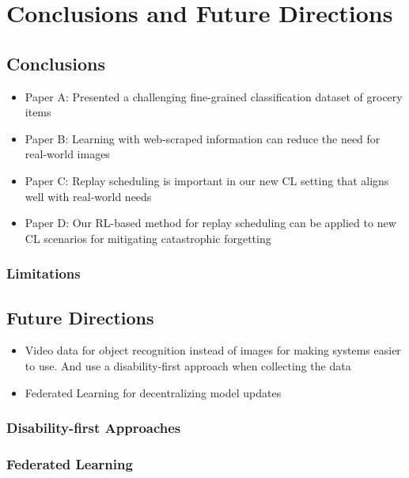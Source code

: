 
\chapter{Conclusions and Future Directions}\label{chap:conclusions}

\section{Conclusions}\label{sec:conclusions}

\begin{itemize}
	\item Paper A: Presented a challenging fine-grained classification dataset of grocery items
	\item Paper B: Learning with web-scraped information can reduce the need for real-world images
	\item Paper C: Replay scheduling is important in our new CL setting that aligns well with real-world needs
	\item Paper D: Our RL-based method for replay scheduling can be applied to new CL scenarios for mitigating catastrophic forgetting
\end{itemize}



\subsection{Limitations}


\section{Future Directions}\label{sec:future_directions}

\begin{itemize}
	\item Video data for object recognition instead of images for making systems easier to use. And use a disability-first approach when collecting the data
	\item Federated Learning for decentralizing model updates 
\end{itemize}


\subsection{Disability-first Approaches}


\subsection{Federated Learning}